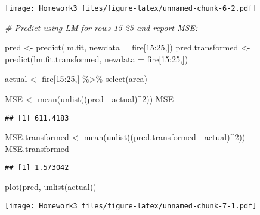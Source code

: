 \documentclass[
]{article}
\newenvironment{Shaded}{\begin{snugshade}}{\end{snugshade}}
\newcommand{\AttributeTok}[1]{\textcolor[rgb]{0.77,0.63,0.00}{#1}}
\newcommand{\CommentTok}[1]{\textcolor[rgb]{0.56,0.35,0.01}{\textit{#1}}}
\newcommand{\DecValTok}[1]{\textcolor[rgb]{0.00,0.00,0.81}{#1}}
\newcommand{\FunctionTok}[1]{\textcolor[rgb]{0.00,0.00,0.00}{#1}}
\newcommand{\NormalTok}[1]{#1}
\newcommand{\OtherTok}[1]{\textcolor[rgb]{0.56,0.35,0.01}{#1}}
\newcommand{\SpecialCharTok}[1]{\textcolor[rgb]{0.00,0.00,0.00}{#1}}
\begin{document}
\texttt{[image: Homework3\_files/figure-latex/unnamed-chunk-6-2.pdf]}

\begin{Shaded}
\begin{Highlighting}[]
\CommentTok{\# Predict using LM for rows 15{-}25 and report MSE:}

\NormalTok{pred }\OtherTok{\textless{}{-}} \FunctionTok{predict}\NormalTok{(lm.fit, }\AttributeTok{newdata =}\NormalTok{ fire[}\DecValTok{15}\SpecialCharTok{:}\DecValTok{25}\NormalTok{,])}
\NormalTok{pred.transformed }\OtherTok{\textless{}{-}} \FunctionTok{predict}\NormalTok{(lm.fit.transformed, }\AttributeTok{newdata =}\NormalTok{ fire[}\DecValTok{15}\SpecialCharTok{:}\DecValTok{25}\NormalTok{,])}

\NormalTok{actual }\OtherTok{\textless{}{-}}\NormalTok{ fire[}\DecValTok{15}\SpecialCharTok{:}\DecValTok{25}\NormalTok{,] }\SpecialCharTok{\%\textgreater{}\%} \FunctionTok{select}\NormalTok{(area)}

\NormalTok{MSE }\OtherTok{\textless{}{-}} \FunctionTok{mean}\NormalTok{(}\FunctionTok{unlist}\NormalTok{((pred }\SpecialCharTok{{-}}\NormalTok{ actual)}\SpecialCharTok{\^{}}\DecValTok{2}\NormalTok{))}
\NormalTok{MSE}
\end{Highlighting}
\end{Shaded}

\begin{verbatim}
## [1] 611.4183
\end{verbatim}

\begin{Shaded}
\begin{Highlighting}[]
\NormalTok{MSE.transformed }\OtherTok{\textless{}{-}} \FunctionTok{mean}\NormalTok{(}\FunctionTok{unlist}\NormalTok{((pred.transformed }\SpecialCharTok{{-}}\NormalTok{ actual)}\SpecialCharTok{\^{}}\DecValTok{2}\NormalTok{))}
\NormalTok{MSE.transformed}
\end{Highlighting}
\end{Shaded}

\begin{verbatim}
## [1] 1.573042
\end{verbatim}

\begin{Shaded}
\begin{Highlighting}[]
\FunctionTok{plot}\NormalTok{(pred, }\FunctionTok{unlist}\NormalTok{(actual))}
\end{Highlighting}
\end{Shaded}

\texttt{[image: Homework3\_files/figure-latex/unnamed-chunk-7-1.pdf]}
\end{document}
